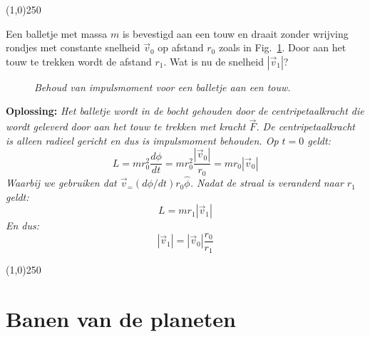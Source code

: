 \begin{center}
\line(1,0){250}
\end{center}
\begin{voorbeeld} 
Een balletje met massa $m$ is bevestigd aan een touw en draait zonder wrijving rondjes met constante snelheid $\vec{v}_0$
op afstand $r_0$ zoals in Fig.~\ref{fig:ImpulsMoment}. Door aan het touw te trekken wordt de afstand $r_1$. Wat is nu de
snelheid $|\vec{v}_1|$?
 \begin{figure}[htbp]
\begin{center}
\caption{{\it Behoud van impulsmoment voor een balletje aan een touw.}}
\label{fig:ImpulsMoment}
\end{center}
\end{figure} 

{\bf Oplossing: }{\it  Het balletje wordt in de bocht gehouden door de centripetaalkracht die wordt geleverd door aan het 
touw te trekken met kracht $\vec{F}$. De centripetaalkracht is alleen radieel gericht en dus is impulsmoment behouden.
Op $t=0$ geldt:
\begin{equation}
L = m r_0^2 \frac{d\phi}{dt} = m r_0^2 \frac{|\vec{v}_0|}{r_0} = m r_0 |\vec{v}_0|
\end{equation}
Waarbij we gebruiken dat $\vec{v}_ = (d\phi / dt) r_0 \hat{\phi}$. Nadat de straal is veranderd naar $r_1$ geldt:
\begin{equation}
L = m r_1 |\vec{v}_1|
\end{equation}
En dus:
\begin{equation}
|\vec{v}_1| = |\vec{v}_0| \frac{r_0}{r_1}
\end{equation}
}
\end{voorbeeld}
\begin{center}
\line(1,0){250}
\end{center}

\section{Banen van de planeten}

